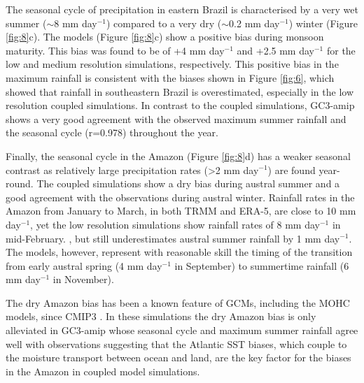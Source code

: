 The seasonal cycle of precipitation in eastern Brazil is characterised by a very wet summer ($\sim$8 mm day$^{-1}$) compared to a very dry ($\sim$0.2 mm day$^{-1}$) winter (Figure \ref{fig:8}c).
The models (Figure \ref{fig:8}c) show a positive bias during monsoon maturity. This bias was found to be of +4 mm day$^{-1}$ and +2.5 mm day$^{-1}$ for the low and medium resolution simulations, respectively.
This positive bias in the maximum rainfall is consistent with the biases shown in Figure \ref{fig:6}, which showed that rainfall in southeastern Brazil is overestimated, especially in the low resolution coupled simulations.   In contrast to the coupled simulations, GC3-amip shows a very good agreement with the observed maximum summer rainfall and the seasonal cycle (r=0.978) throughout the year.

Finally, the seasonal cycle in the Amazon (Figure \ref{fig:8}d) has a weaker seasonal contrast as relatively large precipitation rates  (>2 mm day$^{-1}$) are found year-round. The coupled simulations show a dry bias during austral summer and a good agreement with the observations during austral winter. Rainfall rates in the Amazon from January to March, in both TRMM and ERA-5, are close to 10 mm day$^{-1}$, yet the low resolution simulations show rainfall rates of 8 mm day$^{-1}$ in mid-February.
, but still underestimates austral summer rainfall by 1 mm day$^{-1}$.   
The models, however, represent with reasonable skill the timing of the transition from
early austral spring (4 mm day$^{-1}$ in September) to summertime rainfall (6 mm day$^{-1}$ in November).

The dry Amazon bias has been a known feature of GCMs, including the MOHC models, since CMIP3 \citep{li2006,yin2013}. In these simulations the dry Amazon bias is only alleviated in GC3-amip whose seasonal cycle and maximum summer rainfall agree well with observations suggesting that the Atlantic SST biases, which couple to the moisture transport between ocean and land, are the key factor for the biases in the Amazon in coupled model simulations.   

